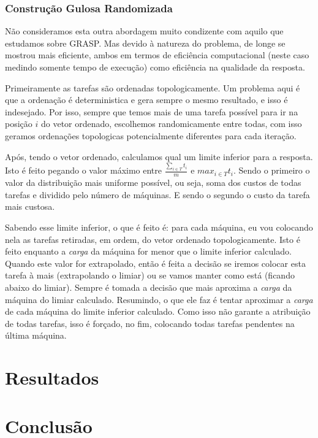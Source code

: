\documentclass{report}
\begin{document}
\subsection{Construção Gulosa Randomizada}

Não consideramos esta outra abordagem muito condizente com aquilo que estudamos
sobre GRASP.
Mas devido à natureza do
problema, de longe se mostrou  mais eficiente, ambos em termos de
eficiência computacional (neste caso medindo
somente tempo de execução) como eficiência na qualidade da resposta.

Primeiramente as tarefas são ordenadas topologicamente.
Um problema aqui é que a ordenação é deterministica e gera
sempre o mesmo resultado, e isso é indesejado.
Por isso, sempre que temos mais de uma tarefa possível para ir na
posição $i$ do vetor ordenado, escolhemos randomicamente entre todas,
com isso geramos ordenações topologicas
potencialmente diferentes para cada iteração.

Após, tendo o vetor ordenado, calculamos qual um limite inferior para a
resposta. Isto é feito pegando o valor máximo entre $\frac{\sum_{i\in T}t_i}{m}$ e $max_{i\in T}t_i$. Sendo o primeiro
o valor da distribuição mais uniforme possível, ou seja, soma dos custos de todas tarefas e dividido pelo
número de máquinas. E sendo o segundo o custo da tarefa mais custosa.

Sabendo esse limite inferior, o que é feito é: para cada máquina, eu vou colocando nela as tarefas retiradas, em ordem,
do vetor ordenado topologicamente. Isto é feito enquanto a \emph{carga} da máquina for menor que o limite inferior
calculado. Quando este valor for extrapolado, então é feita a decisão se iremos colocar esta tarefa à mais
(extrapolando o limiar) ou se vamos manter como está (ficando abaixo do limiar). Sempre é tomada a decisão que mais
aproxima a \emph{carga} da máquina do limiar calculado. Resumindo, o que ele faz é tentar aproximar a \emph{carga} de
cada máquina do limite inferior calculado. Como isso não garante a atribuição de todas tarefas, isso é forçado, no fim,
colocando todas tarefas pendentes na última máquina.

\chapter{Resultados}


\chapter{Conclusão}
\end{document}
